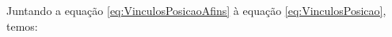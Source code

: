 \documentclass[]{politex}
\begin{document}
Juntando a equação \eqref{eq:VinculosPosicaoAfins} à equação \eqref{eq:VinculosPosicao}, temos:
\end{document}
